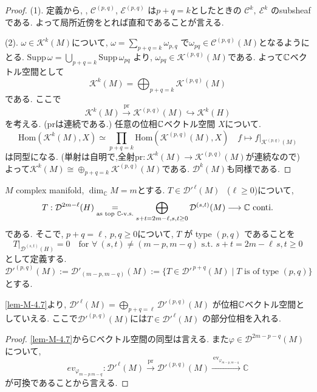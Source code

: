\begin{proof}

(1). 定義から, , \(\mathcal{C}^{(p,q)}\), \(\mathcal{E}^{(p,q)}\) 
は\(p+q=k\)としたときの
\(
\mathcal{C}^{k},\ \mathcal{E}^{k} 
\)
のsubsheafである. よって局所近傍をとれば直和であることが言える. 

(2). $\omega \in \mathcal{K}^{k}(M)$について, 
 \(
\omega=\sum_{p+q=k}\omega_{p, q}
\) で$\omega_{pq}\in \mathcal{C}^{(p,q)}(M)$となるようにとる.
\(
\mathrm{Supp}\,\omega=\bigcup_{p+q=k}\mathrm{Supp}\,\omega_{pq}\)
より, 
\(\omega_{pq}\in \mathcal{K}^{(p,q)}(M)\)である.
よって$\mathbb{C}$ベクトル空間として
\[
\mathcal{K}^{k}(M)
=\bigoplus_{p+q=k}
\mathcal{K}^{(p,q)}(M)
\]
である. ここで
\[
\mathcal{K}^{k}(M)\xrightarrow{\mathrm{pr}}
\mathcal{K}^{(p,q)}(M)\hookrightarrow \mathcal{K}^{k}(H)
\]
を考える. ($\mathrm{pr}$は連続である.)
任意の位相$\mathbb{C}$ベクトル空間
$X$について. 
\[
\mathrm{Hom}(\mathcal{K}^{k}(M),X)
\simeq \prod_{p+q=k}\mathrm{Hom}(\mathcal{K}^{(p,q)}(M),X)
\quad
f \longmapsto f|_{\mathcal{K}^{(p,q)}(M)}
\]
は同型になる. (単射は自明で,全射$\mathrm{pr} : \mathcal{K}^{k}(M)\to \mathcal{K}^{(p,q)}(M)$が連続なので)
よって$\mathcal{K}^{k}(M) \cong \oplus_{p+q=k} \mathcal{K}^{(p,q)}(M)$である. 
 \(\mathcal{D}^{k}(M)\)も同様である. 
\end{proof}

\begin{tcolorbox}[mybox]
\begin{defn}
\label{defn-M-4.8}
\(M\) complex manifold, 
 \(\dim_{\mathbb{C}} M=m\)とする. 
\(T\in \mathcal{D}'^{\,\ell}(M)\) \ (\(\ell\geq 0\))について, 
\[
T:\mathcal{D}^{2m-\ell}(H)\underset{\text{as top $\mathbb{C}$-v.s.}}{=}
\bigoplus_{s+t=2m-\ell, s,t\geq 0} \mathcal{D}^{(s,t)}(M)
\longrightarrow \mathbb{C}\ \text{conti.}
\]
である. そこで,  \(p+q=\ell,\ p,q\geq 0\)について, 
\(T\) が type \((p,q)\) であることを
\[
T|_{\mathcal{D}^{(s,t)}(H)}=0
\quad \text{for } \forall\ (s,t)\neq (m-p,m-q) 
\text{ s.t. } s+t=2m-\ell \, s,t\geq 0
\]
として定義する. 
$\mathcal{D}'^{(p,q)}(M):=\mathcal{D}'_{(m-p,m-q)}(M):=\{T\in \mathcal{D}'^{\,p+q}(M)\mid T \text{ is of type }(p,q)\}$とする. 
\end{defn}
\end{tcolorbox}

\ref{lem-M-4.7}より, 
\(
\mathcal{D}'^{\,\ell}(M)=\bigoplus_{p+q=\ell}\mathcal{D}'^{(p,q)}(M)
\)
が位相$\mathbb{C}$ベクトル空間としていえる. 
ここで\(\mathcal{D}'^{(p,q)}(M)\)には\(T\in \mathcal{D}'^{\,\ell}(M)\) の部分位相を入れる. 
\begin{proof}
\ref{lem-M-4.7}から$\mathbb{C}$ベクトル空間の同型は言える. 
また$\varphi\in \mathcal{D}^{2m-p-q}(M)$について, 
\[
ev_{\varphi_{m-p. m-q}}
:\mathcal{D}'^{\,\ell}(M)
\xrightarrow{\ \mathrm{pr}\ }\mathcal{D}'^{(p,q)}(M)
\xrightarrow{\  \mathrm{ev}_{\varphi_{m-p,m-q}}\ }
\mathbb{C}
\]
が可換であることから言える. 
\end{proof}

